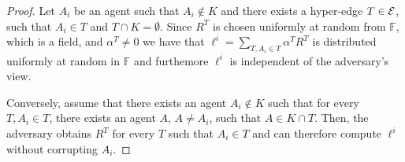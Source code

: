 \documentclass[letterpaper,11pt]{article}
\begin{document}
\begin {proof}
Let $A_i$ be an agent such that $A_i \not \in K$ and there exists a hyper-edge $T\in {\cal E}$, such that $A_i \in T$ and $T\cap K=\emptyset$. Since $R^T$ is chosen uniformly at random from $\mathbb{F}$, which is a field, and $\alpha^T \neq 0$ we have that $\ell^i=\sum_{T, A_i \in T} \alpha^T R^T$ is distributed uniformly at random in $\mathbb{F}$ and furthemore $\ell^i$ is independent of the adversary's view.  

Conversely, assume that there exists an agent $A_i \not \in K$ such that for every $T, A_i \in T$, there exists an agent $A$, $A \neq A_i$,  such that $A \in K \cap T$. Then, the adversary obtains $R^T$ for every $T$ such that $A_i \in T$ and can therefore compute $\ell^i$ without corrupting $A_i$.
\end {proof} 
\end{document}
